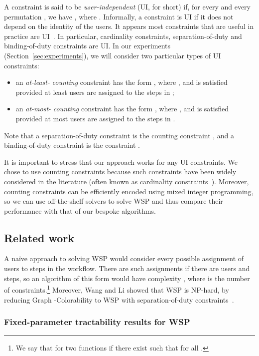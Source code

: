 \documentclass[jcs,crcready]{iosart1c}
\begin{document}
A constraint  is said to be \emph{user-independent} (UI, for short) if, for every  and every permutation , we have , where .
Informally, a constraint is UI if it does not depend on the identity of the users.
It appears most constraints that are useful in practice are UI~\cite{CoCrGaGuJo14}.
In particular, cardinality constraints, separation-of-duty and binding-of-duty constraints are UI.
In our experiments (Section~\ref{sec:experiments}), we will consider two particular types of UI constraints:
\begin{itemize}
 \item an \emph{at-least-} \emph{counting} constraint has the form , where , and is satisfied provided at least  users are assigned to the steps in ;
 \item an \emph{at-most-} \emph{counting} constraint has the form , where , and is satisfied provided at most  users are assigned to the steps in .
\end{itemize}
Note that a separation-of-duty constraint  is the counting constraint , and a binding-of-duty constraint  is the constraint .

It is important to stress that our approach works for any UI constraints.
We chose to use counting constraints because such constraints have been widely considered in the literature (often known as cardinality constraints~\cite{CoCrGaGuJo14}).
Moreover, counting constraints can be efficiently encoded using mixed integer programming, so we can use off-the-shelf solvers to solve WSP and thus compare their performance with that of our bespoke algorithms.

\subsection{Related work}

A na\"ive approach to solving WSP would consider every possible assignment of users to steps in the workflow.
There are  such assignments if there are  users and  steps, so an algorithm of this form would have complexity , where  is the number of constraints.\footnote{We say that  for two functions  if there exist  such that  for all .}
Moreover, Wang and Li showed that WSP is NP-hard, by reducing {\sc Graph -Colorability} to WSP with separation-of-duty constraints~\cite[Lemma 3]{WaLi10}.

\subsubsection{Fixed-parameter tractability results for WSP}
\label{sec:fpt-results}
\end{document}
